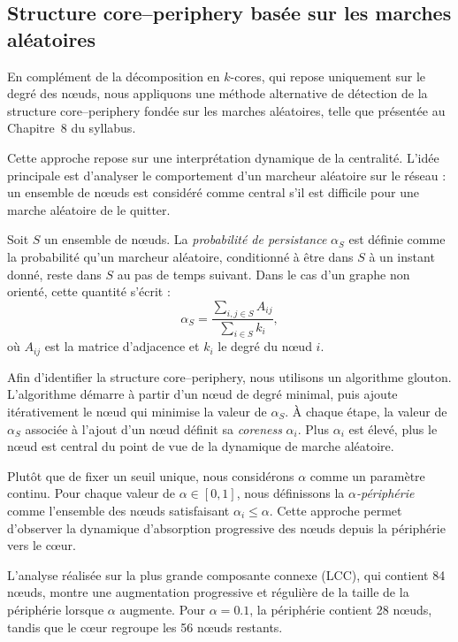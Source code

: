 \documentclass[10pt,twocolumn]{article}
\begin{document}
\subsection{Structure core--periphery basée sur les marches aléatoires}

En complément de la décomposition en $k$-cores, qui repose uniquement sur le degré des nœuds,
nous appliquons une méthode alternative de détection de la structure
core--periphery fondée sur les marches aléatoires, telle que présentée au
Chapitre~8 du syllabus.

\medskip

Cette approche repose sur une interprétation dynamique de la centralité.
L’idée principale est d’analyser le comportement d’un marcheur aléatoire sur le réseau :
un ensemble de nœuds est considéré comme central s’il est difficile pour une marche
aléatoire de le quitter.

\medskip

Soit $S$ un ensemble de nœuds. La \emph{probabilité de persistance} $\alpha_S$ est définie comme
la probabilité qu’un marcheur aléatoire, conditionné à être dans $S$ à un instant donné,
reste dans $S$ au pas de temps suivant. Dans le cas d’un graphe non orienté, cette quantité
s’écrit :
\[
\alpha_S = \frac{\sum_{i,j \in S} A_{ij}}{\sum_{i \in S} k_i},
\]
où $A_{ij}$ est la matrice d’adjacence et $k_i$ le degré du nœud $i$.

\medskip

Afin d’identifier la structure core--periphery, nous utilisons un algorithme glouton.
L’algorithme démarre à partir d’un nœud de degré minimal, puis ajoute itérativement
le nœud qui minimise la valeur de $\alpha_S$.
À chaque étape, la valeur de $\alpha_S$ associée à l’ajout d’un nœud définit sa
\emph{coreness} $\alpha_i$.
Plus $\alpha_i$ est élevé, plus le nœud est central du point de vue de la dynamique
de marche aléatoire.

\medskip

Plutôt que de fixer un seuil unique, nous considérons $\alpha$ comme un paramètre continu.
Pour chaque valeur de $\alpha \in [0,1]$, nous définissons la
\emph{$\alpha$-périphérie} comme l’ensemble des nœuds satisfaisant $\alpha_i \le \alpha$.
Cette approche permet d’observer la dynamique d’absorption progressive des nœuds
depuis la périphérie vers le cœur.

\medskip

L’analyse réalisée sur la plus grande composante connexe (LCC), qui contient 84 nœuds,
montre une augmentation progressive et régulière de la taille de la périphérie lorsque
$\alpha$ augmente. Pour $\alpha = 0.1$, la périphérie contient 28 nœuds, tandis que
le cœur regroupe les 56 nœuds restants.
\end{document}
